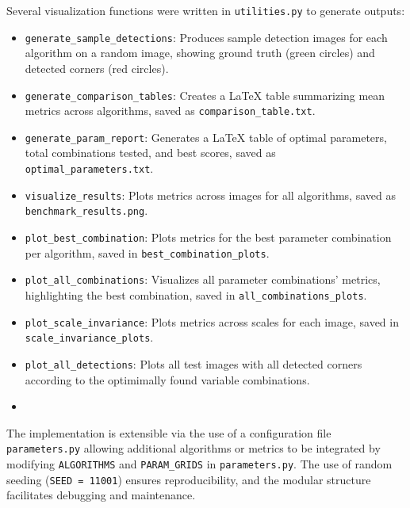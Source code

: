 \documentclass[journal]{IEEEtran}
\begin{document}
Several visualization functions were written in \texttt{utilities.py} to generate outputs:
\begin{itemize}
    \item \texttt{generate\_sample\_detections}: Produces sample detection images for each algorithm on a random image, showing ground truth (green circles) and detected corners (red circles).
    \item \texttt{generate\_comparison\_tables}: Creates a LaTeX table summarizing mean metrics across algorithms, saved as \texttt{comparison\_table.txt}.
    \item \texttt{generate\_param\_report}: Generates a LaTeX table of optimal parameters, total combinations tested, and best scores, saved as \texttt{optimal\_parameters.txt}.
    \item \texttt{visualize\_results}: Plots metrics across images for all algorithms, saved as \texttt{benchmark\_results.png}.
    \item \texttt{plot\_best\_combination}: Plots metrics for the best parameter combination per algorithm, saved in \texttt{best\_combination\_plots}.
    \item \texttt{plot\_all\_combinations}: Visualizes all parameter combinations’ metrics, highlighting the best combination, saved in \texttt{all\_combinations\_plots}.
    \item \texttt{plot\_scale\_invariance}: Plots metrics across scales for each image, saved in \texttt{scale\_invariance\_plots}.
    \item \texttt{plot\_all\_detections}: Plots all test images with all detected corners according to the optimimally found variable combinations.
    \item 
\end{itemize}

The implementation is extensible via the use of a configuration file \texttt{parameters.py} allowing additional algorithms or metrics to be integrated by modifying \texttt{ALGORITHMS} and \texttt{PARAM\_GRIDS} in \texttt{parameters.py}. The use of random seeding (\texttt{SEED = 11001}) ensures reproducibility, and the modular structure facilitates debugging and maintenance.\\
\end{document}
